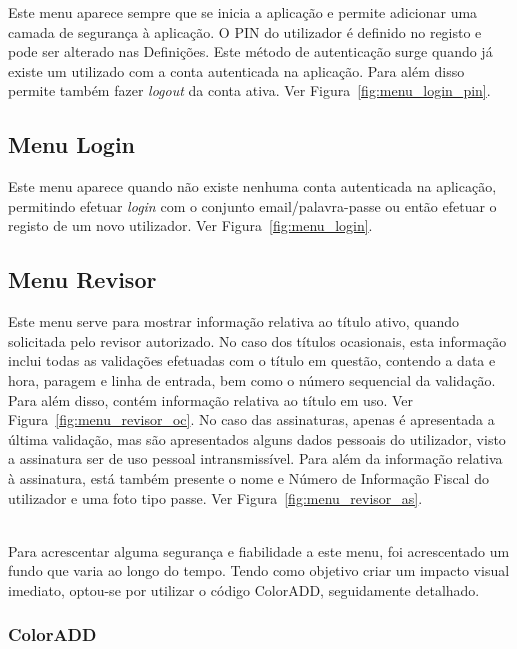 Este menu aparece sempre que se inicia a aplicação e permite adicionar uma camada de segurança à aplicação. O PIN do utilizador é definido no registo e pode ser alterado nas Definições. Este método de autenticação surge quando já existe um utilizado com a conta autenticada na aplicação. Para além disso permite também fazer \emph{logout} da conta ativa. Ver Figura~\ref{fig:menu_login_pin}.

\subsection{Menu Login}

Este menu aparece quando não existe nenhuma conta autenticada na aplicação, permitindo efetuar \emph{login} com o conjunto email/palavra-passe ou então efetuar o registo de um novo utilizador. Ver Figura~\ref{fig:menu_login}.

\subsection{Menu Revisor}

Este menu serve para mostrar informação relativa ao título ativo, quando solicitada pelo revisor autorizado. No caso dos títulos ocasionais, esta informação inclui todas as validações efetuadas com o título em questão, contendo a data e hora, paragem e linha de entrada, bem como o número sequencial da validação. Para além disso, contém informação relativa ao título em uso. Ver Figura~\ref{fig:menu_revisor_oc}. No caso das assinaturas, apenas é apresentada a última validação, mas são apresentados alguns dados pessoais do utilizador, visto a assinatura ser de uso pessoal intransmissível. Para além da informação relativa à assinatura, está também presente o nome e Número de Informação Fiscal do utilizador e uma foto tipo passe. Ver Figura~\ref{fig:menu_revisor_as}.

~\\Para acrescentar alguma segurança e fiabilidade a este menu, foi acrescentado um fundo que varia ao longo do tempo. Tendo como objetivo criar um impacto visual imediato, optou-se por utilizar o código ColorADD, seguidamente detalhado.

\subsubsection{ColorADD}

